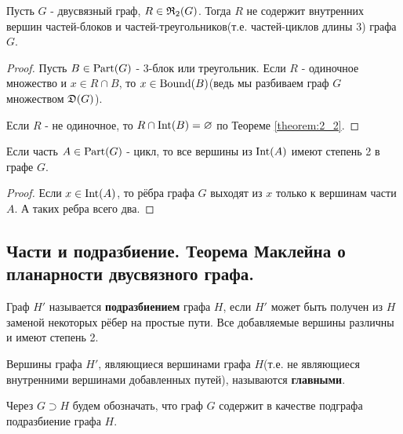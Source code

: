 \begin{customcrly}{2.1} \label{corollary:2_1}
	Пусть $G$ - двусвязный граф, $R \in \mathfrak{R}_2(G)$. Тогда $R$ не содержит внутренних вершин частей-блоков и частей-треугольников(т.е. частей-циклов длины 3) графа $G$.
\end{customcrly}
\begin{proof}
	Пусть $B \in \operatorname{Part}(G)$ - 3-блок или треугольник.
	Если  $R$ - одиночное множество и $x \in R \cap B$, то $x \in \operatorname{Bound}(B)$(ведь мы разбиваем граф $G$ множеством $\mathfrak{D}(G)$).
	
	Если  $R$ - не одиночное, то $R \cap \operatorname{Int}(B) = \varnothing$ по Теореме \ref{theorem:2_2}.
\end{proof}

\begin{customcrly}{2.2} \label{corollary:2_2}
	Если часть $A \in \operatorname{Part}(G)$ - цикл, то все вершины из  $\operatorname{Int}(A)$ имеют степень 2 в графе $G$.
\end{customcrly}
\begin{proof}
	Если $x \in \operatorname{Int}(A)$, то рёбра графа $G$ выходят из $x$ только к вершинам части  $A$.
	А таких ребра всего два.
\end{proof}

\subsection{Части и подразбиение. Теорема Маклейна о планарности двусвязного графа.}

\begin{df*}[Подразбиение]
	Граф $H'$ называется \textbf{подразбиением} графа $H$, если  $H'$ может быть получен из  $H$ заменой некоторых рёбер на простые пути.
	Все добавляемые вершины различны и имеют степень 2. 

	Вершины графа $H'$, являющиеся вершинами графа  $H$(т.е. не являющиеся внутренними вершинами добавленных путей), называются \textbf{главными}.
\end{df*}

\begin{prop*}
	Через $G \supset H$ будем обозначать, что граф  $G$ содержит в качестве подграфа подразбиение графа  $H$.
\end{prop*}

